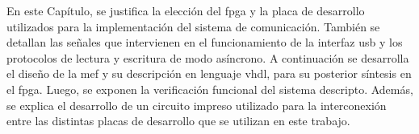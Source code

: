 
En este Capítulo, se justifica la elección del \acrshort{fpga} y la placa de desarrollo utilizados para la implementación del sistema de comunicación. También se detallan las señales que intervienen en el funcionamiento de la interfaz \acrshort{usb} y los protocolos de lectura y escritura de modo asíncrono. A continuación se desarrolla el diseño de la \acrshort{mef} y su descripción en lenguaje \acrshort{vhdl}, para su posterior síntesis en el \acrshort{fpga}. Luego, se exponen la verificación funcional del sistema descripto. Además, se explica el desarrollo de un circuito impreso utilizado para la interconexión entre las distintas placas de desarrollo que se utilizan en este trabajo.
